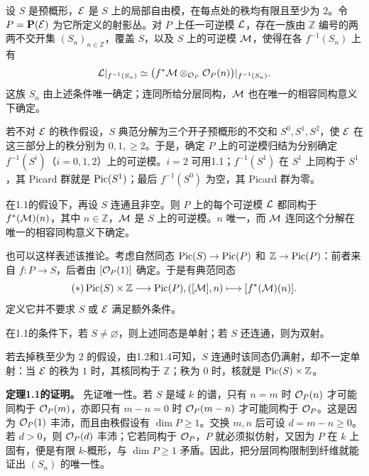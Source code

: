 
设 \(S\) 是预概形，\(\mathcal E\) 是 \(S\) 上的局部自由模，在每点处的秩均有限且至少为 \(2\)。令 \(P=\mathbf P(\mathcal E)\) 为它所定义的射影丛。对 \(P\) 上任一可逆模 \(\mathcal L\)，存在一族由 \(\mathbb Z\) 编号的两两不交开集 \((S_n)_{n\in\mathbb Z}\)，覆盖 \(S\)，以及 \(S\) 上的可逆模 \(\mathcal M\)，使得在各 \(f^{-1}(S_n)\) 上有
\[
\mathcal L|_{f^{-1}(S_n)}
  \simeq \bigl(f^*\mathcal M\otimes_{\mathcal O_P}\mathcal O_P(n)\bigr)|_{f^{-1}(S_n)} .
\]
这族 \(S_n\) 由上述条件唯一确定；连同所给分层同构，\(\mathcal M\) 也在唯一的相容同构意义下确定。


若不对 \(\mathcal E\) 的秩作假设，\(S\) 典范分解为三个开子预概形的不交和 \(S^0,S^1,S^2\)，使 \(\mathcal E\) 在这三部分上的秩分别为 \(0,1,\ge 2\)。于是，确定 \(P\) 上的可逆模归结为分别确定 \(f^{-1}(S^i)\)（\(i=0,1,2\)）上的可逆模。\(i=2\) 可用1.1；\(f^{-1}(S^1)\) 在 \(S^1\) 上同构于 \(S^1\)，其 Picard 群就是 \(\operatorname{Pic}(S^1)\)；最后 \(f^{-1}(S^0)\) 为空，其 Picard 群为零。


在1.1的假设下，再设 \(S\) 连通且非空。则 \(P\) 上的每个可逆模 \(\mathcal L\) 都同构于 \(f^*(\mathcal M)(n)\)，其中 \(n\in\mathbb Z\)，\(\mathcal M\) 是 \(S\) 上的可逆模。\(n\) 唯一，而 \(\mathcal M\) 连同这个分解在唯一的相容同构意义下确定。

也可以这样表述该推论。考虑自然同态 \(\operatorname{Pic}(S)\to\operatorname{Pic}(P)\) 和 \(\mathbb Z\to\operatorname{Pic}(P)\)：前者来自 \(f:P\to S\)，后者由 \([\mathcal O_P(1)]\) 确定。于是有典范同态
\[
(*)
\operatorname{Pic}(S)\times\mathbb Z\longrightarrow\operatorname{Pic}(P),
([\mathcal M],n)\longmapsto[f^*(\mathcal M)(n)] .
\]
定义它并不要求 \(S\) 或 \(\mathcal E\) 满足额外条件。


在1.1的条件下，若 \(S\ne\varnothing\)，则上述同态是单射；若 \(S\) 还连通，则为双射。

若去掉秩至少为 \(2\) 的假设，由1.2和1.4可知，\(S\) 连通时该同态仍满射，却不一定单射：当 \(\mathcal E\) 的秩为 \(1\) 时，其核同构于 \(\mathbb Z\)；秩为 \(0\) 时，核就是 \(\operatorname{Pic}(S)\times\mathbb Z\)。

\medskip\noindent\textbf{定理1.1的证明。}
先证唯一性。若 \(S\) 是域 \(k\) 的谱，只有 \(n=m\) 时 \(\mathcal O_P(n)\) 才可能同构于 \(\mathcal O_P(m)\)，亦即只有 \(m-n=0\) 时 \(\mathcal O_P(m-n)\) 才可能同构于 \(\mathcal O_P\)。这是因为 \(\mathcal O_P(1)\) 丰沛，而且由秩假设有 \(\dim P\ge 1\)。交换 \(m,n\) 后可设 \(d=m-n\ge 0\)。若 \(d>0\)，则 \(\mathcal O_P(d)\) 丰沛；它若同构于 \(\mathcal O_P\)，\(P\) 就必须拟仿射，又因为 \(P\) 在 \(k\) 上固有，便是有限 \(k\)-概形，与 \(\dim P\ge 1\) 矛盾。因此，把分层同构限制到纤维就能证出 \((S_n)\) 的唯一性。

